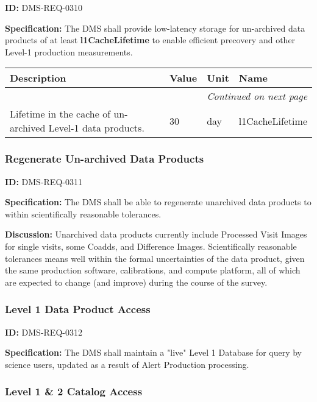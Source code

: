 \documentclass[SE,toc,lsstdraft]{lsstdoc}
\makeatletter
\newcommand{\paramname}[1]{\hspace{0pt}#1}
\newcommand{\unitname}[1]{\hspace{0pt}#1}
\newenvironment{parameters}[0]{%
\setlength\LTleft{0pt}
\setlength\LTright{\fill}
\begin{small}
\begin{longtable}[]{|p{0.5\textwidth}|l|p{0.6in}|p{1.74in}@{}|}

\hline \textbf{Description} & \textbf{Value} & \textbf{Unit} & \textbf{Name} \\ \hline
\endhead

\hline \multicolumn{4}{r}{\emph{Continued on next page}} \\
\endfoot

\hline\hline
\endlastfoot
}{%
\hline
\end{longtable}
\end{small}
}
\makeatother
\begin{document}
\label{DMS-REQ-0310}
\textbf{ID:} DMS-REQ-0310

\textbf{Specification:} The DMS shall provide low-latency storage for un-archived data products of at least \textbf{l1CacheLifetime }to enable efficient precovery and other Level-1 production measurements.





\begin{parameters}
Lifetime in the cache of un-archived Level-1 data products.
&
30
&
\unitname{%
day
}
&
\paramname{%
l1CacheLifetime
} \\\hline
\end{parameters}




\subsubsection{Regenerate Un-archived Data Products}

\label{DMS-REQ-0311}
\textbf{ID:} DMS-REQ-0311

\textbf{Specification:} The DMS shall be able to regenerate unarchived data products to within scientifically reasonable tolerances.

\textbf{Discussion: }Unarchived data products currently include Processed Visit Images for single visits, some Coadds, and Difference Images. Scientifically reasonable tolerances means well within the formal uncertainties of the data product, given the same production software, calibrations, and compute platform, all of which are expected to change (and improve) during the course of the survey.




\subsubsection{Level 1 Data Product Access}

\label{DMS-REQ-0312}
\textbf{ID:} DMS-REQ-0312

\textbf{Specification:} The DMS shall maintain a "live" Level 1 Database for query by science users, updated as a result of Alert Production processing.






\subsubsection{Level 1 \& 2 Catalog Access}
\end{document}
